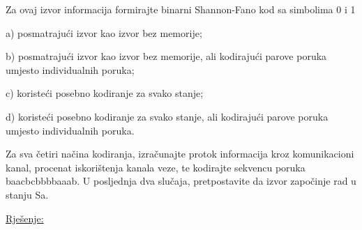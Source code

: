 \documentclass[12pt]{article}
\begin{document}
Za ovaj izvor informacija formirajte binarni Shannon-Fano kod sa simbolima 0 i 1

a) posmatrajući izvor kao izvor bez memorije;

b) posmatrajući izvor kao izvor bez memorije, ali kodirajući parove poruka umjesto individualnih poruka;

c) koristeći posebno kodiranje za svako stanje;

d) koristeći posebno kodiranje za svako stanje, ali kodirajući parove poruka umjesto individualnih poruka.

Za sva četiri načina kodiranja, izračunajte protok informacija kroz komunikacioni kanal, procenat iskorištenja kanala veze, te kodirajte sekvencu poruka baacbcbbbbaaab. U posljednja dva slučaja, pretpostavite da izvor započinje rad u stanju Sa.

\underline{Rješenje:}\\
\end{document}
